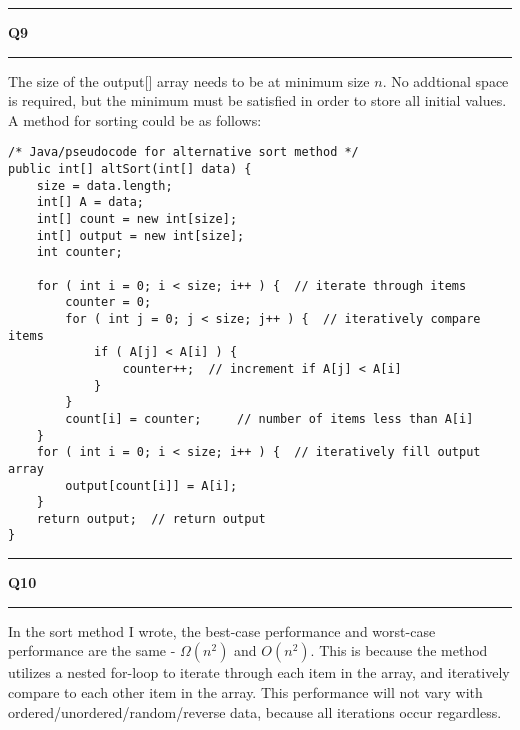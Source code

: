\documentclass[11pt]{article}
\newcommand\question[2]{\vspace{.25in}\hrule\textbf{#1 #2}\vspace{.5em}\hrule\vspace{.10in}}
\begin{document}
\question{Q9}{}
The size of the output[] array needs to be at minimum size $n$. No addtional space is required, but the minimum must be satisfied in order to store all initial values. A method for sorting could be as follows:

\begin{lstlisting}
/* Java/pseudocode for alternative sort method */
public int[] altSort(int[] data) {
	size = data.length;
	int[] A = data;
	int[] count = new int[size];
	int[] output = new int[size];
	int counter;
	
	for ( int i = 0; i < size; i++ ) { 	// iterate through items
		counter = 0;
		for ( int j = 0; j < size; j++ ) { 	// iteratively compare items
			if ( A[j] < A[i] ) {
				counter++; 	// increment if A[j] < A[i]
			}
		}
		count[i] = counter; 	// number of items less than A[i]
	}
	for ( int i = 0; i < size; i++ ) { 	// iteratively fill output array
		output[count[i]] = A[i];
	}
	return output; 	// return output
}

\end{lstlisting}

\question{Q10}{}
In the sort method I wrote, the best-case performance and worst-case performance are the same - $\Omega(n^2)$ and $O(n^2)$. This is because the method utilizes a nested for-loop to iterate through each item in the array, and iteratively compare to each other item in the array. This performance will not vary with ordered/unordered/random/reverse data, because all iterations occur regardless.
\end{document}
